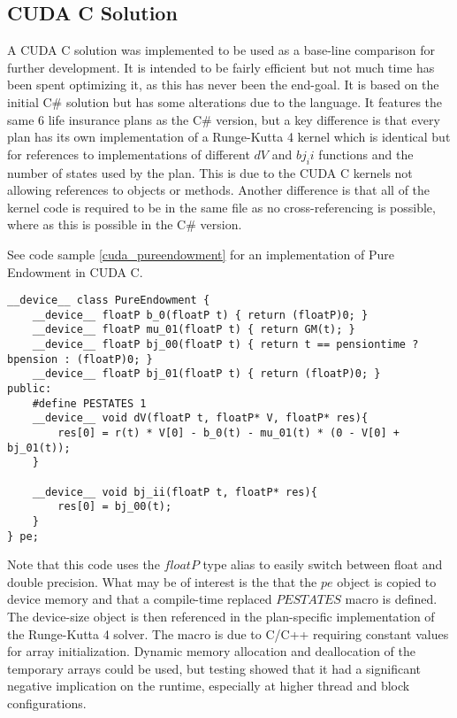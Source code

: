 \subsection{CUDA C Solution}
A CUDA C solution was implemented to be used as a base-line comparison for further development.
It is intended to be fairly efficient but not much time has been spent optimizing it, as this has never been the end-goal.
It is based on the initial C\# solution but has some alterations due to the language.
It features the same 6 life insurance plans as the C\# version, but a key difference is that every plan has its own implementation of a Runge-Kutta 4 kernel which is identical but for references to implementations of different $dV$ and $bj_ii$ functions and the number of states used by the plan.
This is due to the CUDA C kernels not allowing references to objects or methods. %
Another difference is that all of the kernel code is required to be in the same file as no cross-referencing is possible, where as this is possible in the C\# version.

See code sample \ref{cuda_pureendowment} for an implementation of Pure Endowment in CUDA C.
\begin{lstlisting}[caption=The pure endowment insurance plan expressed in C\#, label=cuda_pureendowment]
__device__ class PureEndowment {
	__device__ floatP b_0(floatP t) { return (floatP)0; }
	__device__ floatP mu_01(floatP t) { return GM(t); }
	__device__ floatP bj_00(floatP t) { return t == pensiontime ? bpension : (floatP)0; }
	__device__ floatP bj_01(floatP t) { return (floatP)0; }
public:
	#define PESTATES 1
	__device__ void dV(floatP t, floatP* V, floatP* res){ 
		res[0] = r(t) * V[0] - b_0(t) - mu_01(t) * (0 - V[0] + bj_01(t));
	}

	__device__ void bj_ii(floatP t, floatP* res){
		res[0] = bj_00(t);
	}
} pe;
\end{lstlisting}

Note that this code uses the $floatP$ type alias to easily switch between float and double precision.
What may be of interest is the that the $pe$ object is copied to device memory and that a compile-time replaced $PESTATES$ macro is defined.
The device-size object is then referenced in the plan-specific implementation of the Runge-Kutta 4 solver.
The macro is due to C/C++ requiring constant values for array initialization.
Dynamic memory allocation and deallocation of the temporary arrays could be used, but testing showed that it had a significant negative implication on the runtime, especially at higher thread and block configurations.

